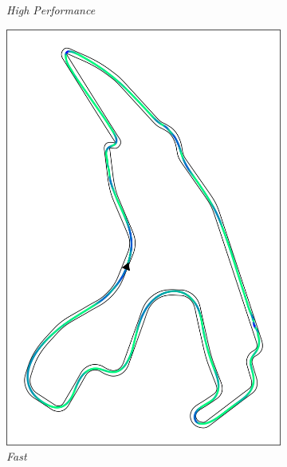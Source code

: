 \begin{figure}[H]
\begin{subfigure}[b]{0.3\textwidth}
        \caption{\textit{High Performance}}
        \label{fig:tracking_hp_spa}
    \end{subfigure}
    \begin{subfigure}[b]{0.3\textwidth}
        \centering
        \includegraphics[width=\textwidth]{images/spa_mpc_fast_crosstrack.png}
        \caption{\textit{Fast}}
        \label{fig:tracking_fast_spa}
    \end{subfigure}
    \begin{subfigure}[b]{0.366\textwidth}
        \centering

\end{subfigure}
\end{figure}
